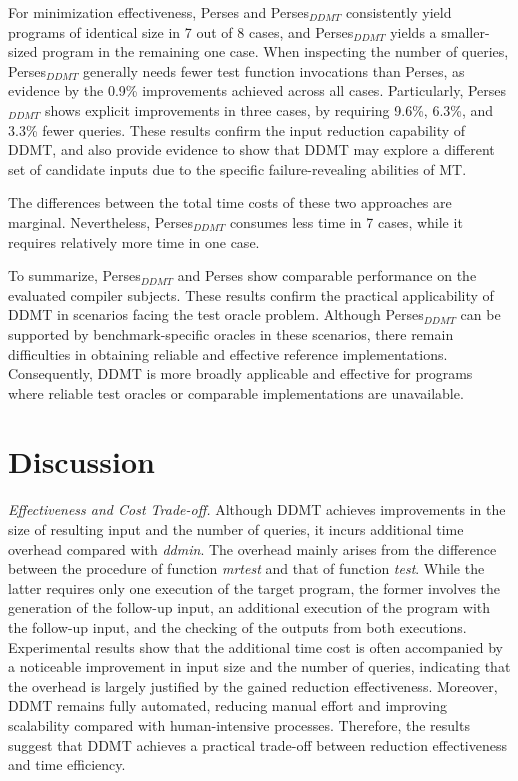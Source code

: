 For minimization effectiveness, Perses and Perses$_{DDMT}$ consistently yield programs of identical size in 7 out of 8 cases, and Perses$_{DDMT}$ yields a smaller-sized program in the remaining one case.
When inspecting the number of queries, Perses$_{DDMT}$ generally needs fewer test function invocations than Perses, as evidence by the 0.9\% improvements achieved across all cases.
Particularly, Perses$_{DDMT}$ shows explicit improvements in three cases, by requiring 9.6\%, 6.3\%, and 3.3\% fewer queries.
These results confirm the input reduction capability of DDMT, and also provide evidence to show that DDMT may explore a different set of candidate inputs due to the specific failure-revealing abilities of MT.

The differences between the total time costs of these two approaches are marginal.
Nevertheless, Perses$_{DDMT}$ consumes less time in 7 cases, while it requires relatively more time in one case.

To summarize, Perses$_{DDMT}$ and Perses show comparable performance on the evaluated compiler subjects. 
These results confirm the practical applicability of DDMT in scenarios facing the test oracle problem.
Although Perses$_{DDMT}$ can be supported by benchmark-specific oracles in these scenarios, there remain difficulties in obtaining reliable and effective reference implementations.
Consequently, DDMT is more broadly applicable and effective for programs where reliable test oracles or comparable implementations are unavailable.

\section{Discussion}
\label{sec:dis}


\emph{Effectiveness and Cost Trade-off.}
Although DDMT achieves improvements in the size of resulting input and the number of queries, it incurs additional time overhead compared with \emph{ddmin}. The overhead mainly arises from the difference between the procedure of function \emph{mrtest} and that of function \emph{test}.
While the latter requires only one execution of the target program, the former involves the generation of the follow-up input, an additional execution of the program with the follow-up input, and the checking of the outputs from both executions.
Experimental results show that the additional time cost is often accompanied by a noticeable improvement in input size and the number of queries, indicating that the overhead is largely justified by the gained reduction effectiveness. 
Moreover, DDMT remains fully automated, reducing manual effort and improving scalability compared with human-intensive processes. 
Therefore, the results suggest that DDMT achieves a practical trade-off between reduction effectiveness and time efficiency.

